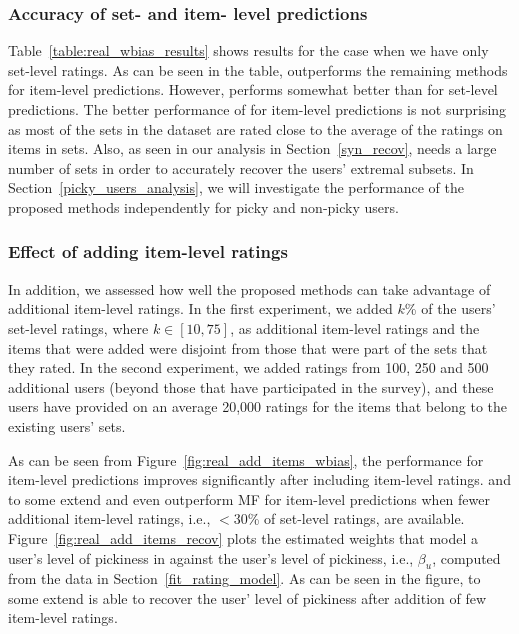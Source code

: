 \subsubsection{Accuracy of set- and item- level predictions}
Table~\ref{table:real_wbias_results} shows results for the case when we have
only set-level ratings. 
As can be seen in the table, \ARM outperforms the remaining methods for item-level 
predictions. However, \VO performs somewhat better than \ARM for set-level predictions. The better performance
of \ARM for item-level predictions is not surprising as most of the sets in the dataset
are rated close to the average of the ratings on items in sets. Also, as seen in
our analysis in Section~\ref{syn_recov}, \ES needs a large number of sets
in order to accurately recover the users' extremal subsets. In
Section~\ref{picky_users_analysis}, we will investigate the performance of the
proposed methods independently for picky and non-picky users.  


\subsubsection{Effect of adding item-level ratings}
In addition, we assessed how
well the proposed methods can take advantage of additional item-level
ratings. 
In the first experiment, we added $k$\% of the users' set-level ratings, where $k
\in [10, 75]$, as additional item-level ratings and the items that were added 
were disjoint from those that were part of the sets that they rated. 
In the second experiment, we added ratings from 100, 250 and 500 additional users (beyond
those that have participated in the survey), and these users have provided on an
average 20,000 ratings for the items that belong to the existing users' sets.

As can be seen from Figure~\ref{fig:real_add_items_wbias}, the  performance for
item-level predictions improves significantly after including item-level
ratings. 
\ARM and to some extend \ES and \VO even outperform  MF for item-level
predictions when fewer additional item-level ratings, i.e., $< 30$\% of
set-level ratings, are available.
Figure~\ref{fig:real_add_items_recov} plots the estimated weights that model a
user's level of pickiness in \VO against the user's level of pickiness, i.e.,
$\beta_u$, computed
from the data in Section~\ref{fit_rating_model}. As can be seen in the figure, to some
extend \VO is
able to recover the user' level of pickiness after addition of few item-level
ratings.


